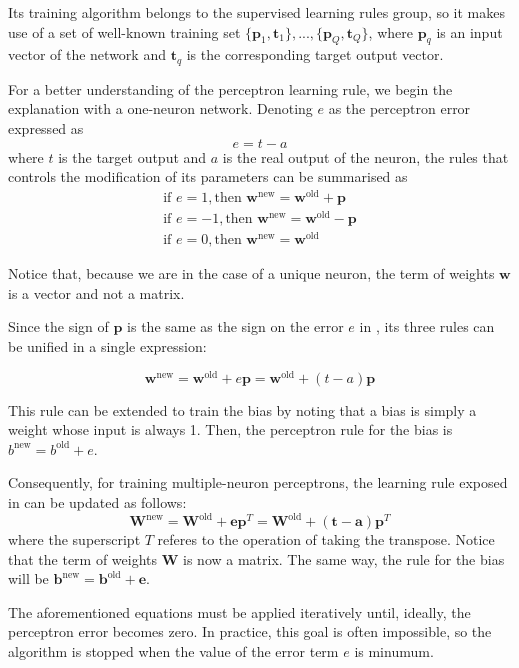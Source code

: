 Its training algorithm belongs to the supervised learning rules group, 
so it makes use of a set of well-known training set $\{\mathbf{p}_1,\mathbf{t}_1\}, ... , \{\mathbf{p}_Q,\mathbf{t}_Q\}$, where $\mathbf{p}_q$ is an input vector of the network and $\mathbf{t}_q$ is the corresponding target output vector. 

For a better understanding of the perceptron learning rule, 
we begin the explanation with a one-neuron network. 
Denoting $e$ as the perceptron error expressed as
\begin{equation}
e=t-a
\end{equation}
where $t$ is the target output and $a$ is the real output of the neuron, the rules that controls the modification of its parameters can be summarised as \cite{Demuth:2014:NND:2721661}
\begin{equation}
\begin{align}
\text{if } e=1,
\text{then } \mathbf{w}^{\text{new}} = \mathbf{w}^{\text{old}}+\mathbf{p}\\
\text{if } e=-1,
\text{then } \mathbf{w}^{\text{new}} = \mathbf{w}^{\text{old}}-\mathbf{p}\\
\text{if } e=0,
\text{then } \mathbf{w}^{\text{new}} = \mathbf{w}^{\text{old}}
\end{align}
\label{eq:perceptron3rules}
\end{equation}

Notice that, because we are in the case of a unique neuron, the term of weights $\mathbf{w}$ is a vector and not a matrix. 

Since the sign of $\mathbf{p}$ is the same as the sign on the error $e$ in , its three rules can be unified in a single expression:

\begin{equation}
\mathbf{w}^{\text{new}} = \mathbf{w}^{\text{old}}+e\mathbf{p} = \mathbf{w}^{\text{old}}+(t-a)\mathbf{p}
\label{eq:perceptron1rule}
\end{equation}

This rule can be extended to train the bias by noting that a bias is simply a weight whose input is always 1.
Then, the perceptron rule for the bias is 
$b^{\text{new}}=b^{\text{old}}+e$.

Consequently, for training multiple-neuron perceptrons, the learning rule exposed in  can be updated as follows:
\begin{equation}
\mathbf{W}^{\text{new}} = \mathbf{W}^{\text{old}}+\mathbf{e}\mathbf{p}^{T} = \mathbf{W}^{\text{old}}+(\mathbf{t}-\mathbf{a})\mathbf{p}^{T}
\label{eq:perceptron1rule}
\end{equation}
where the superscript $T$ referes to the operation of taking the transpose. Notice that the term of weights $\mathbf{W}$ is now a matrix. The same way, the rule for the bias will be $\mathbf{b}^{\text{new}}=\mathbf{b}^{\text{old}}+\mathbf{e}$.

The aforementioned equations must be applied iteratively until, ideally, the perceptron error becomes zero. In practice, this goal is often impossible, so the algorithm is stopped when the value of the error term $e$ is minumum.



